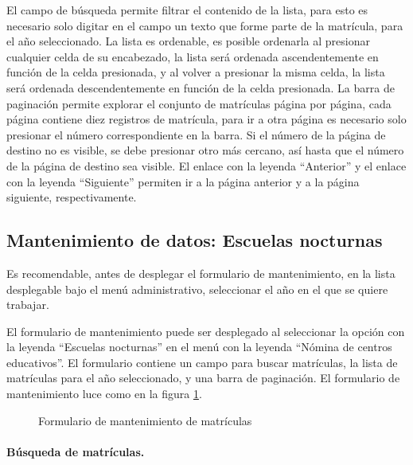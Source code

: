 \documentclass[a4paper, 9pt, conference]{article}              %
\begin{document}
El campo de b\'usqueda permite filtrar el contenido de la lista, para esto es necesario solo digitar en el campo un texto que forme parte de la matr\'icula, para el a\~no seleccionado. La lista es ordenable, es posible ordenarla al presionar cualquier celda de su encabezado, la lista ser\'a ordenada ascendentemente en funci\'on de la celda presionada, y al volver a presionar la misma celda, la lista ser\'a ordenada descendentemente en funci\'on de la celda presionada. La barra de paginaci\'on permite explorar el conjunto de matr\'iculas p\'agina por p\'agina, cada p\'agina contiene diez registros de matr\'icula, para ir a otra p\'agina es necesario solo presionar el n\'umero correspondiente en la barra. Si el n\'umero de la p\'agina de destino no es visible, se debe presionar otro m\'as cercano, as\'i hasta que el n\'umero de la p\'agina de destino sea visible. El enlace con la leyenda ``Anterior'' y el enlace con la leyenda ``Siguiente'' permiten ir a la p\'agina anterior y a la p\'agina siguiente, respectivamente.


\subsection{Mantenimiento de datos: Escuelas nocturnas}
Es recomendable, antes de desplegar el formulario de mantenimiento, en la lista desplegable bajo el men\'u administrativo, seleccionar el a\~no en el que se quiere trabajar.

El formulario de mantenimiento puede ser desplegado al seleccionar la opci\'on con la leyenda ``Escuelas nocturnas'' en el men\'u con la leyenda ``N\'omina de centros educativos''. El formulario contiene un campo para buscar matr\'iculas, la lista de matr\'iculas para el a\~no seleccionado, y una barra de paginaci\'on. El formulario de mantenimiento luce como en la figura \ref{fig:geoenrollments7}.

\begin{figure}
	\centering
		\caption{Formulario de mantenimiento de matr\'iculas}
	\label{fig:geoenrollments7}
\end{figure}


\paragraph{B\'usqueda de matr\'iculas.}
\end{document}
